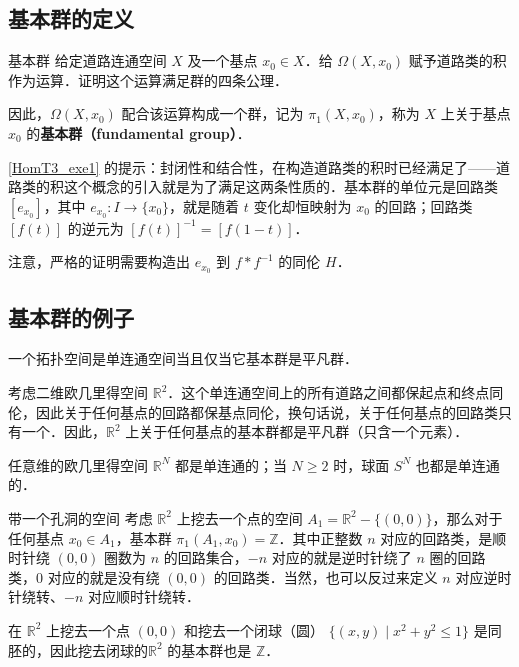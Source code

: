 \subsection{基本群的定义}

\begin{exercise}{基本群}\label{HomT3_exe1}
给定道路连通空间 $X$ 及一个基点 $x_0\in X$．给 $\Omega(X, x_0)$ 赋予道路类的积作为运算．证明这个运算满足群的四条公理．

因此，$\Omega(X, x_0)$ 配合该运算构成一个群，记为 $\pi_1(X, x_0)$，称为 $X$ 上关于基点 $x_0$ 的\textbf{基本群（fundamental group）}．
\end{exercise}

\autoref{HomT3_exe1} 的提示：封闭性和结合性，在构造道路类的积时已经满足了——道路类的积这个概念的引入就是为了满足这两条性质的．基本群的单位元是回路类 $[e_{x_0}]$，其中 $e_{x_0}: I\rightarrow\{x_0\}$，就是随着 $t$ 变化却恒映射为 $x_0$ 的回路；回路类 $[f(t)]$ 的逆元为 $[f(t)]^{-1}=[f(1-t)]$．

注意，严格的证明需要构造出 $e_{x_0}$ 到 $f*f^{-1}$ 的同伦 $H$．

\subsection{基本群的例子}

\begin{theorem}{}
一个拓扑空间是单连通空间当且仅当它基本群是平凡群．
\end{theorem}

\begin{example}{}
考虑二维欧几里得空间 $\mathbb{R}^2$．这个单连通空间上的所有道路之间都保起点和终点同伦，因此关于任何基点的回路都保基点同伦，换句话说，关于任何基点的回路类只有一个．因此，$\mathbb{R}^2$ 上关于任何基点的基本群都是平凡群（只含一个元素）．

任意维的欧几里得空间 $\mathbb{R}^N$ 都是单连通的；当 $N \geq 2$ 时，球面 $S^N$ 也都是单连通的．
\end{example}

\begin{example}{带一个孔洞的空间}
考虑 $\mathbb{R}^2$ 上挖去一个点的空间 $A_1=\mathbb{R}^2-\{(0,0)\}$，那么对于任何基点 $x_0\in A_1$，基本群 $\pi_1(A_1, x_0)=\mathbb{Z}$．其中正整数 $n$ 对应的回路类，是顺时针绕 $(0,0)$ 圈数为 $n$ 的回路集合，$-n$ 对应的就是逆时针绕了 $n$ 圈的回路类，$0$ 对应的就是没有绕 $(0,0)$ 的回路类．当然，也可以反过来定义 $n$ 对应逆时针绕转、$-n$ 对应顺时针绕转．

在 $\mathbb{R}^2$ 上挖去一个点 $(0, 0)$ 和挖去一个闭球（圆） $\{(x, y) \mid  x^2 + y^2 \leq 1\}$ 是同胚的，因此挖去闭球的$\mathbb{R}^2$ 的基本群也是 $\mathbb{Z}$．
\end{example}


